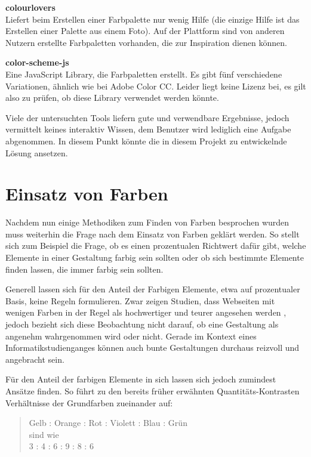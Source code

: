 \textbf{colourlovers} \\
Liefert beim Erstellen einer Farbpalette nur wenig Hilfe (die einzige Hilfe ist das Erstellen einer Palette aus einem Foto). Auf der Plattform sind von anderen Nutzern erstellte Farbpaletten vorhanden, die zur Inspiration dienen können.

\textbf{color-scheme-js} \\
Eine JavaScript Library, die Farbpaletten erstellt. Es gibt fünf verschiedene Variationen, ähnlich wie bei Adobe Color CC. Leider liegt keine Lizenz bei, es gilt also zu prüfen, ob diese Library verwendet werden könnte.

Viele der untersuchten Tools liefern gute und verwendbare Ergebnisse, jedoch vermittelt keines interaktiv Wissen, dem Benutzer wird lediglich eine Aufgabe abgenommen. In diesem Punkt könnte die in diesem Projekt zu entwickelnde Lösung ansetzen.


\section{Einsatz von Farben}\label{einsatz}

Nachdem nun einige Methodiken zum Finden von Farben besprochen wurden muss weiterhin die Frage nach dem Einsatz von Farben geklärt werden. So stellt sich zum Beispiel die Frage, ob es einen prozentualen Richtwert dafür gibt, welche Elemente in einer Gestaltung farbig sein sollten oder ob sich bestimmte Elemente finden lassen, die immer farbig sein sollten.

Generell lassen sich für den Anteil der Farbigen Elemente, etwa auf prozentualer Basis, keine Regeln formulieren. Zwar zeigen Studien, dass Webseiten mit wenigen Farben in der Regel als hochwertiger und teurer angesehen werden \cite{zhang2016makes}, jedoch bezieht sich diese Beobachtung nicht darauf, ob eine Gestaltung als angenehm wahrgenommen wird oder nicht. Gerade im Kontext eines Informatikstudienganges können auch bunte Gestaltungen durchaus reizvoll und angebracht sein.

Für den Anteil der farbigen Elemente in sich lassen sich jedoch zumindest Ansätze finden. So führt \cite[S. 59]{Itten201006} zu den bereits früher erwähnten Quantitäts-Kontrasten Verhältnisse der Grundfarben zueinander auf:

\begin{quote}
Gelb : Orange : Rot : Violett : Blau : Grün \\
sind wie \\
3 : 4 : 6 : 9 : 8 : 6
\end{quote}


